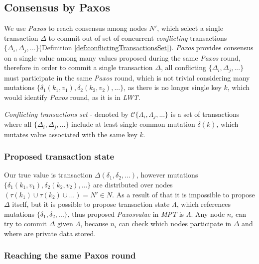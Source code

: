 \documentclass[runningheads,a4paper]{llncs}
\newcommand{\nodesTx}{$\mathit{N'}$\xspace}
\newcommand{\transaction}{$\Delta$\xspace}
\newcommand{\transactions}{$\{\Delta_{i}, \Delta_{j}, ...\}$\xspace}
\newcommand{\txStates}{$\{\Lambda_{i}, \Lambda_{j}, ...\}$\xspace}
\newcommand{\conflictingTxSet}{$\mathcal{C}\text{\txStates}$\xspace}
\newcommand{\nodesOfMutations}{$(\tau(k_1) \cup \tau(k_2) \cup ... ) =  \text{\nodesTx}\in\mathit{N}$\xspace}
\newcommand{\mutations}{$\{\delta_{1}, \delta_{2}, ...\}$\xspace}
\newcommand{\mutationsFull}{$\{\delta_{1}(k_1, v_1), \delta_{2}(k_2, v_2), ...\}$\xspace}
\newcommand{\transactionFull}{$\Delta(\delta_{1}, \delta_{2}, ...)$\xspace}
\newcommand{\txState}{$\Lambda$\xspace}
\newcommand{\paxos}{\emph{Paxos}\xspace}
\newcommand{\mpt}{\emph{MPT}\xspace}
\newcommand{\lwt}{\emph{LWT}\xspace}
\newcommand{\node}[1]{$n_{#1}$\xspace}
\begin{document}
\subsection{Consensus by Paxos}

We use \paxos to reach consensus among nodes \nodesTx, which select a single transaction \transaction to commit out of set of concurrent \emph{conflicting} transactions \transactions (Definition \ref{def:conflictingTransactionsSet}). \paxos provides consensus on a single value among many values proposed during the same \paxos round, therefore in order to commit a single transaction \transaction, all conflicting \transactions must participate in the same \paxos round, which is not trivial considering many mutations \mutationsFull, as there is no longer single key $k$, which would identify \paxos round, as it is in \lwt.

\begin{definition}
  \label{def:conflictingTransactionsSet}
  \emph{Conflicting transactions set} - denoted by \conflictingTxSet is a set of transactions where all \transactions include at least single common mutation $\delta(k)$, which mutates value associated with the same key $k$.
\end{definition}

\subsubsection{Proposed transaction state}

Our true value is transaction \transactionFull, however mutations \mutationsFull are distributed over nodes
\nodesOfMutations. As a result of that it is impossible to propose \transaction itself, but it is possible to propose transaction state \txState, which references mutations \mutations, thus proposed \paxos \emph{value} in \mpt is \txState. Any node \node{i} can try to commit \transaction given \txState, because \node{i} can check which nodes participate in \transaction and where are private data stored.

\subsubsection{Reaching the same Paxos round}
\end{document}
